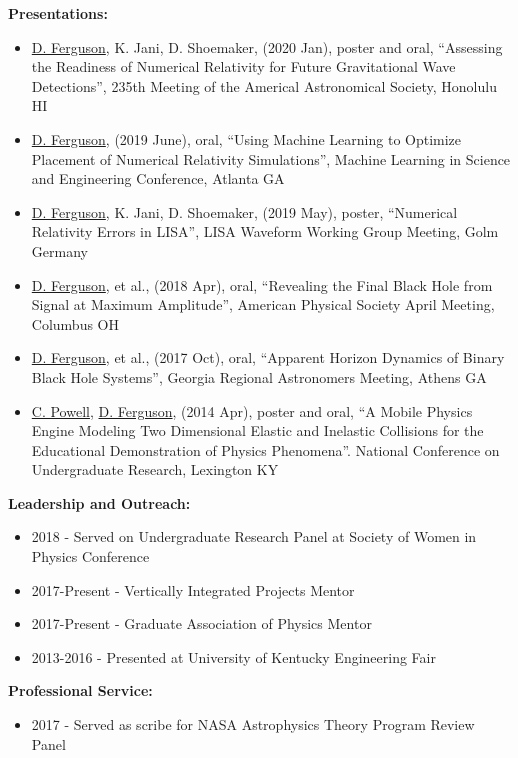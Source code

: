 \documentclass[11pt]{article}
\begin{document}
\begin{flushleft}
  \textbf{Presentations:}
  \begin{itemize}
  \item \underline{D. Ferguson}, K. Jani, D. Shoemaker, (2020 Jan), poster and oral, ``Assessing the Readiness of Numerical Relativity for Future Gravitational Wave Detections'', 235th Meeting of the Americal Astronomical Society, Honolulu HI
  \item \underline{D. Ferguson}, (2019 June), oral, ``Using Machine Learning to Optimize Placement of Numerical Relativity Simulations'', Machine Learning in Science and Engineering Conference, Atlanta GA
  \item \underline{D. Ferguson}, K. Jani, D. Shoemaker, (2019 May), poster, ``Numerical Relativity Errors in LISA'', LISA Waveform Working Group Meeting, Golm Germany
  \item \underline{D. Ferguson}, et al., (2018 Apr), oral, ``Revealing the Final Black Hole from Signal at Maximum Amplitude'', American Physical Society April Meeting, Columbus OH
  \item \underline{D. Ferguson}, et al., (2017 Oct), oral, ``Apparent Horizon Dynamics of Binary Black Hole Systems'', Georgia Regional Astronomers Meeting, Athens GA
  \item \underline{C. Powell}, \underline{D. Ferguson}, (2014 Apr), poster and oral, ``A Mobile Physics Engine Modeling Two Dimensional Elastic and Inelastic Collisions for the Educational Demonstration of Physics Phenomena''. National Conference on Undergraduate Research, Lexington KY  
  \end{itemize}
  
  \textbf{Leadership and Outreach:}
  \begin{itemize}
  \item 2018 - Served on Undergraduate Research Panel at Society of Women in Physics Conference
  \item 2017-Present - Vertically Integrated Projects Mentor
  \item 2017-Present - Graduate Association of Physics Mentor
  \item 2013-2016 - Presented at University of Kentucky Engineering Fair
  \end{itemize}

  \textbf{Professional Service: }
  \begin{itemize}
  \item 2017 - Served as scribe for NASA Astrophysics Theory Program Review Panel
  \end{itemize}
  
\end{flushleft}
\end{document}
